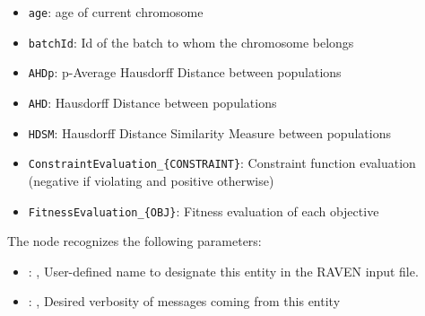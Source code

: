 \begin{itemize}
             \item \texttt{age}: age of current chromosome
             \item \texttt{batchId}: Id of the batch to whom the chromosome belongs
             \item \texttt{AHDp}: p-Average Hausdorff Distance between populations
             \item \texttt{AHD}: Hausdorff Distance between populations
             \item \texttt{HDSM}: Hausdorff Distance Similarity Measure between populations
             \item \texttt{ConstraintEvaluation\_\{CONSTRAINT\}}: Constraint function evaluation (negative if violating and positive otherwise)
             \item \texttt{FitnessEvaluation\_\{OBJ\}}: Fitness evaluation of each objective

         \end{itemize}

  The  node recognizes the following parameters:
    \begin{itemize}
      \item {}: ,
        User-defined name to designate this entity in the RAVEN input file.
      \item {}: ,
        Desired verbosity of messages coming from this entity
  \end{itemize}


